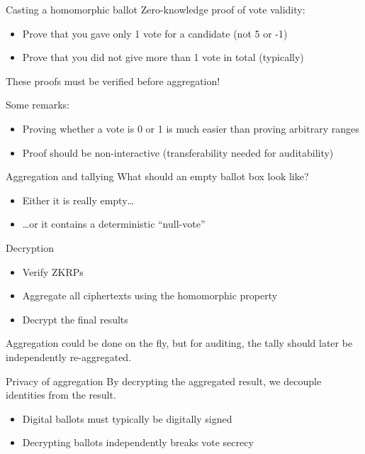\begin{frame}{Casting a homomorphic ballot}
  Zero-knowledge proof of vote validity:
  \begin{itemize}[<+(1)->]
    \item Prove that you gave only 1 vote for a candidate (not 5 or -1)
    \item Prove that you did not give more than 1 vote in total (typically)
  \end{itemize}

  \pause
  These proofs must be verified before aggregation!

  \vspace*{1em}

  \pause
  Some remarks:
  \begin{itemize}[<+(1)->]
    \item Proving whether a vote is 0 or 1 is much easier than proving arbitrary ranges
    \item Proof should be non-interactive (transferability needed for auditability)
  \end{itemize}
\end{frame}

\begin{frame}{Aggregation and tallying}
  What should an empty ballot box look like?
  \begin{itemize}[<+(1)->]
    \item Either it is really empty\dots
    \item \dots{}or it contains a deterministic \enquote{null-vote}
  \end{itemize}

  \pause
  Decryption
  \begin{itemize}[<+(1)->]
    \item Verify ZKRPs
    \item Aggregate all ciphertexts using the homomorphic property
    \item Decrypt the final results
  \end{itemize}

  \pause
  Aggregation could be done on the fly, but for auditing, the tally should later be independently re-aggregated.
\end{frame}

\begin{frame}{Privacy of aggregation}
  By decrypting the aggregated result, we decouple identities from the result.
  \begin{itemize}[<+(1)->]
    \item Digital ballots must typically be digitally signed
    \item Decrypting ballots independently breaks vote secrecy
  \end{itemize}
\end{frame}

